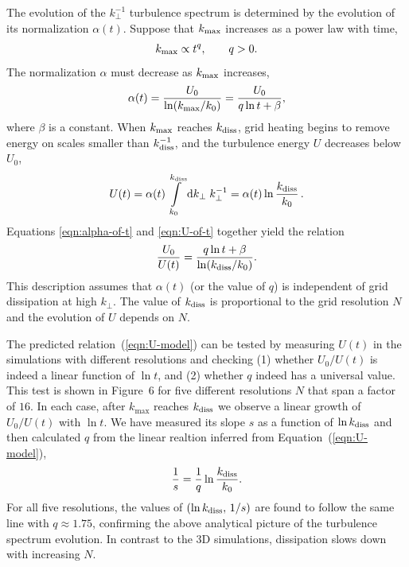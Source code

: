 The evolution of the $k_\perp^{-1}$ turbulence spectrum is determined by the evolution of its normalization $\alpha(t)$.
Suppose that $k_{\rm max}$ increases as a power law with time, 
%
\begin{equation}
  k_{\rm max} \propto t^q, \qquad q>0.
\end{equation}
%
The normalization $\alpha$ must decrease as $k_{\rm max}$ increases,
%
\begin{equation}\label{eqn:alpha-of-t}
	\alpha(t) = \frac{U_0}{\ln(k_{\rm max}/k_0)} = \frac{U_0}{q\ln t+\beta},
\end{equation}
%
where $\beta$ is a constant. When $k_{\rm max}$ reaches $k_{\rm diss}$, grid heating begins to remove energy on scales smaller than $k_{\rm diss}^{-1}$, and the turbulence energy $U$ decreases below $U_0$,
%
\begin{equation}\label{eqn:U-of-t}
	U(t) = \alpha(t) \int\limits_{k_{0}} ^{k_{\rm diss}} \mathrm{d} k_{\perp}\; k_\perp^{-1} = \alpha(t) \ln \frac{k_{\rm diss}}{k_0}\, .
\end{equation} 
%
Equations \ref{eqn:alpha-of-t} and \ref{eqn:U-of-t} together yield the relation
\begin{equation}\label{eqn:U-model}
	\frac{U_0}{U(t)} = \frac{q\ln t + \beta}{\ln(k_{\rm diss} / k_0)}.
\end{equation}
%
This description assumes that $\alpha(t)$ (or the value of $q$) is independent of grid dissipation at high $k_\perp$. The value of $k_{\rm diss}$ is proportional to the grid resolution $N$ and the evolution of $U$ depends on $N$.

The predicted relation~(\ref{eqn:U-model}) can be tested by measuring $U(t)$ in the simulations with different resolutions and checking (1) whether $U_0/U(t)$ is indeed a linear function of $\ln t$, and (2) whether $q$ indeed has a universal value. This test is shown in Figure~6 for five different resolutions $N$ that span a factor of $16$. In each case, after $k_{\max}$ reaches $k_{\rm diss}$ we observe a linear growth of $U_0/U(t)$ with $\ln t$. We have measured its slope $s$ as a function of $\ln k_{\rm diss}$ and then calculated $q$ from the linear realtion inferred from Equation~(\ref{eqn:U-model}),
%
\begin{equation}
   \frac{1}{s}=\frac{1}{q}\ln\frac{k_{\rm diss}}{k_0}.
\end{equation}
%
For all five resolutions, the values of $(\ln k_{\rm diss},\,1/s)$ are found to follow the same line with $q\approx 1.75$, confirming the above analytical picture of the turbulence spectrum evolution. In contrast to the 3D simulations, dissipation slows down with increasing $N$.

